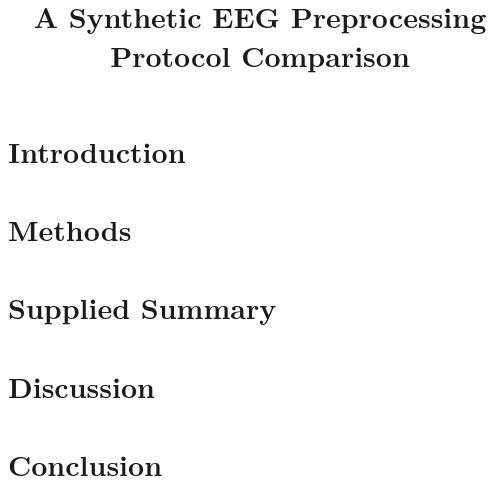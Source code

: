 \documentclass[10pt]{article}
\title{A Synthetic EEG Preprocessing Protocol Comparison}
\author{}
\date{}
\begin{document}
\maketitle
\begin{abstract}
\end{abstract}
\section{Introduction}
\section{Methods}
\section{Supplied Summary}
\section{Discussion}
\section{Conclusion}


\end{document}
